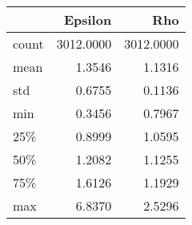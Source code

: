 \begin{tabular}{lrr}
\toprule
{} &    Epsilon &        Rho \\
\midrule
count &  3012.0000 &  3012.0000 \\
mean  &     1.3546 &     1.1316 \\
std   &     0.6755 &     0.1136 \\
min   &     0.3456 &     0.7967 \\
25\%   &     0.8999 &     1.0595 \\
50\%   &     1.2082 &     1.1255 \\
75\%   &     1.6126 &     1.1929 \\
max   &     6.8370 &     2.5296 \\
\bottomrule
\end{tabular}
